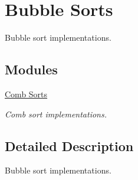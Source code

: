 \hypertarget{group__BubbleSort}{}\section{Bubble Sorts}
\label{group__BubbleSort}


Bubble sort implementations.  


\subsection*{Modules}
\begin{DoxyCompactItemize}
\item 
\hyperlink{group__CombSort}{Comb Sorts}
\begin{DoxyCompactList}\small\item\em Comb sort implementations. \end{DoxyCompactList}\end{DoxyCompactItemize}


\subsection{Detailed Description}
Bubble sort implementations. 

